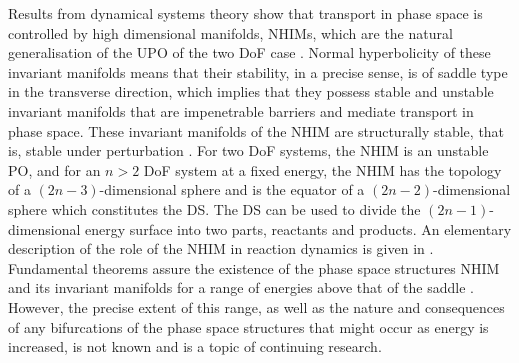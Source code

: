 \documentclass{ws-ijbc}
\begin{document}
Results from dynamical systems theory show that transport in phase space is controlled by high dimensional manifolds, NHIMs, which are the natural generalisation of the UPO of the two DoF case \cite{wiggins90}. Normal hyperbolicity of these invariant manifolds means that their stability, in a precise sense, is of saddle type in the transverse direction, which implies that they possess stable and unstable invariant manifolds that are impenetrable barriers and mediate transport in phase space. These invariant manifolds of the NHIM are structurally stable, that is, stable under perturbation \cite{wiggins2013normally}. For two DoF systems, the NHIM is an unstable PO, and for an $n > 2$ DoF system at a fixed energy, the NHIM has the topology of a $(2n-3)$-dimensional sphere and is the equator of a $(2n-2)$-dimensional sphere which constitutes the DS. The DS can be used to divide the $(2n-1)$-dimensional energy surface into two parts, reactants and products\cite{Gillilan91, Komatsuzaki96, Komatsuzaki97, Komatsuzaki00, Komatsuzaki02a}. An elementary description of the role of the NHIM in reaction dynamics is given in \cite{wiggins2016}. Fundamental theorems assure the existence of the phase space structures \textemdash NHIM and its invariant manifolds \textemdash for a range of energies above that of the saddle \cite{wiggins2013normally}. However, the precise extent of this range, as well as the nature and consequences of any bifurcations of the phase space structures that might occur as energy is increased, is not known and is a topic of continuing research\cite{Li09,Inarrea11, Allahem12, mauguiere2013bifurcations, mackay2014bifurcations, MacKay2015}.
\end{document}
